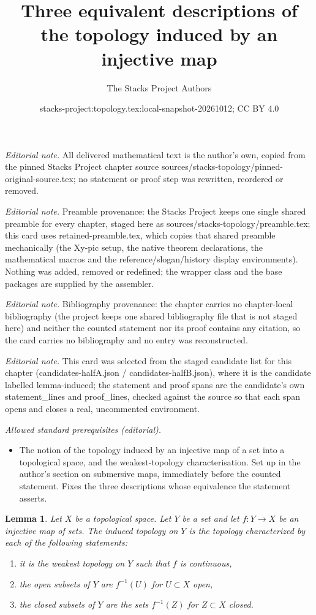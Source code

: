 \documentclass[10pt,a4paper]{amsart}
\title{Three equivalent descriptions of the topology induced by an injective map}
\author{The Stacks Project Authors}
\date{stacks-project:topology.tex:local-snapshot-20261012; CC BY 4.0}
\theoremstyle{plain}
\newtheorem{lemma}[subsection]{Lemma}
\theoremstyle{definition}
\theoremstyle{remark}
\numberwithin{equation}{subsection}
\begin{document}
\maketitle
\noindent\textit{Editorial note.} All delivered mathematical text is the author's own, copied from the pinned Stacks Project chapter source sources/stacks-topology/pinned-original-source.tex; no statement or proof step was rewritten, reordered or removed.\par\medskip
\noindent\textit{Editorial note.} Preamble provenance: the Stacks Project keeps one single shared preamble for every chapter, staged here as sources/stacks-topology/preamble.tex; this card uses retained-preamble.tex, which copies that shared preamble mechanically (the Xy-pic setup, the native theorem declarations, the mathematical macros and the reference/slogan/history display environments). Nothing was added, removed or redefined; the wrapper class and the base packages are supplied by the assembler.\par\medskip
\noindent\textit{Editorial note.} Bibliography provenance: the chapter carries no chapter-local bibliography (the project keeps one shared bibliography file that is not staged here) and neither the counted statement nor its proof contains any citation, so the card carries no bibliography and no entry was reconstructed.\par\medskip
\noindent\textit{Editorial note.} This card was selected from the staged candidate list for this chapter (candidates-halfA.json / candidates-halfB.json), where it is the candidate labelled lemma-induced; the statement and proof spans are the candidate's own statement\_lines and proof\_lines, checked against the source so that each span opens and closes a real, uncommented environment.\par\medskip
\noindent\textit{Allowed standard prerequisites (editorial).}\begin{itemize}
\item The notion of the topology induced by an injective map of a set into a topological space, and the weakest-topology characterisation. Set up in the author's section on submersive maps, immediately before the counted statement. Fixes the three descriptions whose equivalence the statement asserts.
\end{itemize}\medskip
\begin{lemma}
\label{lemma-induced}
Let $X$ be a topological space. Let $Y$ be a set and let
$f : Y \to X$ be an injective map of sets. The induced
topology on $Y$ is the topology characterized by
each of the following statements:
\begin{enumerate}
\item it is the weakest topology on $Y$ such that $f$ is continuous,
\item the open subsets of $Y$ are $f^{-1}(U)$ for $U \subset X$ open,
\item the closed subsets of $Y$ are the sets $f^{-1}(Z)$ for $Z \subset X$
closed.
\end{enumerate}
\end{lemma}
\end{document}
